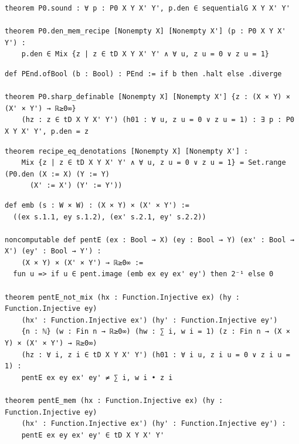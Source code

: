 \begin{lstlisting}
theorem P0.sound : ∀ p : P0 X Y X' Y', p.den ∈ sequentialG X Y X' Y'

theorem P0.den_mem_recipe [Nonempty X] [Nonempty X'] (p : P0 X Y X' Y') :
    p.den ∈ Mix {z | z ∈ tD X Y X' Y' ∧ ∀ u, z u = 0 ∨ z u = 1}
\end{lstlisting}

\begin{lstlisting}
def PEnd.ofBool (b : Bool) : PEnd := if b then .halt else .diverge

theorem P0.sharp_definable [Nonempty X] [Nonempty X'] {z : (X × Y) × (X' × Y') → ℝ≥0∞}
    (hz : z ∈ tD X Y X' Y') (h01 : ∀ u, z u = 0 ∨ z u = 1) : ∃ p : P0 X Y X' Y', p.den = z
\end{lstlisting}

\begin{lstlisting}
theorem recipe_eq_denotations [Nonempty X] [Nonempty X'] :
    Mix {z | z ∈ tD X Y X' Y' ∧ ∀ u, z u = 0 ∨ z u = 1} = Set.range (P0.den (X := X) (Y := Y)
      (X' := X') (Y' := Y'))
\end{lstlisting}

\begin{lstlisting}
def emb (s : W × W) : (X × Y) × (X' × Y') :=
  ((ex s.1.1, ey s.1.2), (ex' s.2.1, ey' s.2.2))

noncomputable def pentE (ex : Bool → X) (ey : Bool → Y) (ex' : Bool → X') (ey' : Bool → Y') :
    (X × Y) × (X' × Y') → ℝ≥0∞ :=
  fun u => if u ∈ pent.image (emb ex ey ex' ey') then 2⁻¹ else 0

theorem pentE_not_mix (hx : Function.Injective ex) (hy : Function.Injective ey)
    (hx' : Function.Injective ex') (hy' : Function.Injective ey')
    {n : ℕ} (w : Fin n → ℝ≥0∞) (hw : ∑ i, w i = 1) (z : Fin n → (X × Y) × (X' × Y') → ℝ≥0∞)
    (hz : ∀ i, z i ∈ tD X Y X' Y') (h01 : ∀ i u, z i u = 0 ∨ z i u = 1) :
    pentE ex ey ex' ey' ≠ ∑ i, w i • z i

theorem pentE_mem (hx : Function.Injective ex) (hy : Function.Injective ey)
    (hx' : Function.Injective ex') (hy' : Function.Injective ey') :
    pentE ex ey ex' ey' ∈ tD X Y X' Y'
\end{lstlisting}

